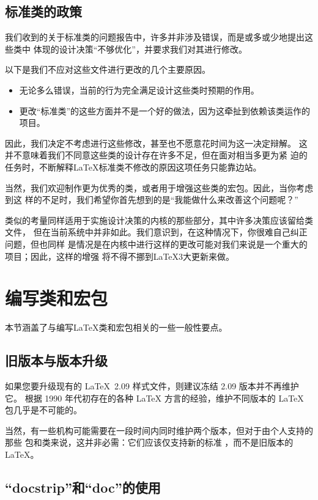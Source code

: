 \documentclass{ltxguide}[1995/11/28]
\begin{document}
\subsection{标准类的政策}

我们收到的关于标准类的问题报告中，许多并非涉及错误，而是或多或少地提出这些类中
体现的设计决策“不够优化”，并要求我们对其进行修改。

以下是我们不应对这些文件进行更改的几个主要原因。
\begin{itemize}
\item
	无论多么错误，当前的行为完全满足设计这些类时预期的作用。
\item
	更改“标准类”的这些方面并不是一个好的做法，因为这牵扯到依赖该类运作的项目。
\end{itemize}

因此，我们决定不考虑进行这些修改，甚至也不愿意花时间为这一决定辩解。
这并不意味着我们不同意这些类的设计存在许多不足，但在面对相当多更为紧
迫的任务时，不断解释\LaTeX{}标准类不修改的原因这项任务只能靠边站。

当然，我们欢迎制作更为优秀的类，或者用于增强这些类的宏包。因此，当你考虑到这
样的不足时，我们希望你首先想到的是“我能做什么来改善这个问题呢？”

类似的考量同样适用于实施设计决策的内核的那些部分，其中许多决策应该留给类文件，
但在当前系统中并非如此。我们意识到，在这种情况下，你很难自己纠正问题，但也同样
是情况是在内核中进行这样的更改可能对我们来说是一个重大的项目；因此，这样的增强
将不得不挪到\LaTeX3大更新来做。

\section{编写类和宏包}
\label{Sec:writing}

本节涵盖了与编写\LaTeX{}类和宏包相关的一些一般性要点。

\subsection{旧版本与版本升级}

如果您要升级现有的 \LaTeX~2.09 样式文件，则建议冻结 2.09 版本并不再维护它。
根据 1990 年代初存在的各种 \LaTeX{} 方言的经验，维护不同版本的 \LaTeX{}
包几乎是不可能的。

当然，有一些机构可能需要在一段时间内同时维护两个版本，但对于由个人支持的那些
包和类来说，这并非必需：它们应该仅支持新的标准 \LaTeXe{}，而不是旧版本的
\LaTeX{}。


\subsection{“docstrip”和“doc”的使用}
\end{document}
